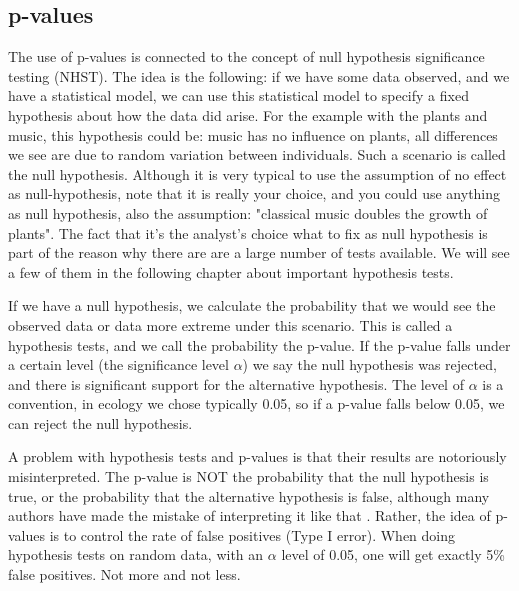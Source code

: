 \documentclass[a4paper,twoside]{tufte-book} %
\begin{document}
\subsection{p-values}

The use of p-values is connected to the concept of null hypothesis significance testing (NHST). The idea is the following: if we have some data observed, and we have a statistical model, we can use this statistical model to specify a fixed hypothesis about how the data did arise. For the example with the plants and music, this hypothesis could be: music has no influence on plants, all differences we see are due to random variation between individuals. Such a scenario is called the null hypothesis.  Although it is very typical to use the assumption of no effect as null-hypothesis, note that it is really your choice, and you could use anything as null hypothesis, also the assumption: "classical music doubles the growth of plants". The fact that it's the analyst's choice what to fix as null hypothesis is part of the reason why there are are a large number of tests available. We will see a few of them in the following chapter about important hypothesis tests.

If we have a null hypothesis, we calculate the probability that we would see the observed data or data more extreme under this scenario. This is called a hypothesis tests, and we call the probability the p-value.  If the p-value falls under a certain level (the significance level $\alpha$) we say the null hypothesis was rejected, and there is significant support for the alternative hypothesis. The level of $\alpha$ is a convention, in ecology we chose typically 0.05, so if a p-value falls below 0.05, we can reject the null hypothesis.  

A problem with hypothesis tests and p-values is that their results are notoriously misinterpreted. The p-value is NOT the probability that the null hypothesis is true, or the probability that the alternative hypothesis is false, although many authors have made the mistake of interpreting it like that \citep[][]{Cohen-earthisround-1994}. Rather, the idea of p-values is to control the rate of false positives (Type I error). When doing hypothesis tests on random data, with an $\alpha$ level of 0.05, one will get exactly 5\% false positives. Not more and not less.  
\end{document}
